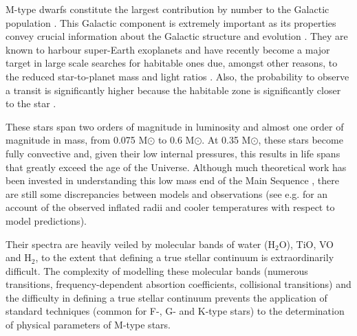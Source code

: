 
M-type dwarfs constitute the largest contribution by number to the
Galactic population \cite{2010AJ....139.2679B}. This Galactic
component is extremely important as its properties convey crucial
information about the Galactic structure and
evolution \cite{2013A&A...556A.110B}. They are known to harbour
super-Earth exoplanets \cite{2013A&A...556A.110B} and have recently
become a major target in large scale searches for habitable ones due,
amongst other reasons, to the reduced star-to-planet mass and light
ratios \cite{2015A&A...577A.128A}. Also, the probability to observe a
transit is significantly higher because the habitable zone is
significantly closer to the star \cite{Shields20161}.

These stars span two orders of magnitude in luminosity and almost one
order of magnitude in mass, from 0.075 M$\odot$ to 0.6 M$\odot$. At
0.35 M$\odot$, these stars become fully convective and, given their
low internal pressures, this results in life spans that greatly exceed
the age of the Universe. Although much theoretical work has been
invested in understanding this low mass end of the Main
Sequence \citep{2008ApJ...676.1262B}, there are still some
discrepancies between models and observations (see
e.g. \cite{2013AN....334....4T} for an account of the observed
inflated radii and cooler temperatures with respect to model
predictions).

Their spectra are heavily veiled by molecular bands of water (H$_2$O),
TiO, VO and H$_2$, to the extent that defining a true stellar
continuum is extraordinarily difficult. The complexity of modelling
these molecular bands (numerous transitions, frequency-dependent
absortion coefficients, collisional transitions) and the difficulty in
defining a true stellar continuum prevents the application of standard
techniques (common for F-, G- and K-type stars) to the determination
of physical parameters of M-type stars.

